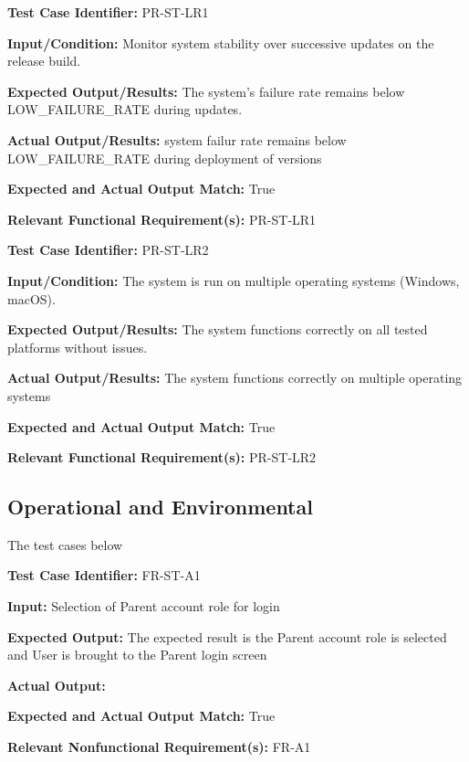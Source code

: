 \documentclass[12pt, titlepage]{article}
\begin{document}
\begin{mdframed}[linewidth=0.5mm]
  \textbf{Test Case Identifier:} PR-ST-LR1 \par
  \textbf{Input/Condition:} Monitor system stability over successive updates on the release build. \par
  \textbf{Expected Output/Results:} The system’s failure rate remains below LOW\_FAILURE\_RATE during updates. \par
  \textbf{Actual Output/Results:} system failur rate remains below \\LOW\_FAILURE\_RATE during deployment of versions \par
  \textbf{Expected and Actual Output Match:} True \par
  \textbf{Relevant Functional Requirement(s):} PR-ST-LR1
\end{mdframed}

\begin{mdframed}[linewidth=0.5mm]
  \textbf{Test Case Identifier:} PR-ST-LR2 \par
  \textbf{Input/Condition:} The system is run on multiple operating systems (Windows, macOS). \par
  \textbf{Expected Output/Results:} The system functions correctly on all tested platforms without issues. \par
  \textbf{Actual Output/Results:} The system functions correctly on multiple operating systems\par
  \textbf{Expected and Actual Output Match:} True \par
  \textbf{Relevant Functional Requirement(s):} PR-ST-LR2
\end{mdframed}

\subsection{Operational and Environmental}
\hspace{2em}The test cases below 

\begin{mdframed}[linewidth=0.5mm] \par
  \textbf{Test Case Identifier:} FR-ST-A1 \par
  \textbf{Input:} Selection of Parent account role for login \par
  \textbf{Expected Output:} The expected result is the Parent account role is selected and User is brought to the Parent login screen \par
  \textbf{Actual Output:} \par
  \textbf{Expected and Actual Output Match:} True \par
  \textbf{Relevant Nonfunctional Requirement(s):} FR-A1
\end{mdframed}
\end{document}
